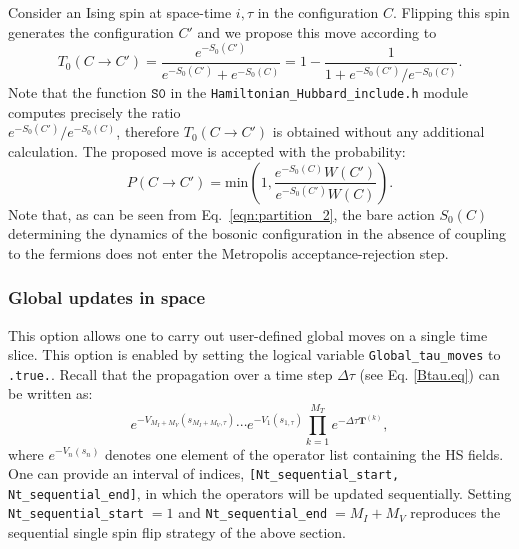 Consider an Ising spin at space-time $i,\tau$ in the configuration $C$. Flipping this spin generates the configuration $C'$ and we propose this move according to 
\begin{equation}
T_0(C \rightarrow C')  =  \frac{e^{-S_0(C')}}{ e^{-S_0(C')} + e^{-S_0(C)} }   = 1 - \frac{1}{1 +  e^{-S_0(C')} /e^{-S_0(C)}}.
\end{equation}
Note that the function $\texttt{S0}$ in the  \texttt{Hamiltonian\_Hubbard\_include.h}  module  computes precisely the ratio\\
 ${e^{-S_0(C')} /e^{-S_0(C)}}$, therefore $T_0(C \rightarrow C') $ is obtained without any additional calculation. 
The proposed move is accepted with the probability: 
\begin{equation}
 P(C \rightarrow C') =  \text{min}  \left( 1,  \frac{e^{-S_0(C)}   W(C')}{ e^{-S_0(C')} W(C)} \right).
\end{equation}
Note that, as can be seen from Eq.~\eqref{eqn:partition_2}, the bare action $S_0(C)$  determining the  dynamics of the bosonic configuration in the absence of coupling to the fermions does not enter the Metropolis acceptance-rejection step.
% 
% 

\subsubsection{Global updates in space} 
\label{sec:global_space}
This option allows one to carry out  user-defined global moves on a single time slice.  This option is enabled by setting the logical variable  \texttt{Global\_tau\_moves} to \texttt{.true.}.  Recall that the propagation over a time step $\Delta \tau$   (see Eq. \ref{Btau.eq}) can be  written as: 
\begin{equation}
	e^{-V_{M_I+M_V}(s_{M_I+M_V,\tau})}  \cdots e^{-V_{1}(s_{1,\tau})}  \prod_{k=1}^{M_T}   e^{-\Delta \tau {\bm T}^{(k)}},
\end{equation}
where $e^{-V_{n}(s_{n})}$ denotes one element of the  operator list  containing the HS fields.  One can provide  an interval of indices, 
\texttt{[Nt\_sequential\_start, Nt\_sequential\_end]},  in which the operators will be updated  sequentially. Setting \texttt{Nt\_sequential\_start}$\; = 1$ and \texttt{Nt\_sequential\_end}$\; = M_I+M_V$  reproduces the  sequential single spin flip strategy of the above section.

